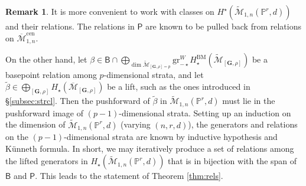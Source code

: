 \documentclass[12pt,reqno]{amsart}
\theoremstyle{definition}
\theoremstyle{definition}
\theoremstyle{definition}
\theoremstyle{definition}
\newtheorem{remark}[theorem]{Remark}
\newcommand{\ol}[1]{\overline{#1}}
\newcommand{\PP}{\mathbb{P}}
\newcommand{\Mcal}{\mathcal{M}}
\newcommand{\Mbar}{\ol{\Mcal}}
\newcommand{\Mtil}{\widetilde{\mathcal{M}}}
\newcommand{\gr}{\mathrm{gr}}
\begin{document}
\begin{remark}
It is more convenient to work with classes on $H^\star(\Mtil_{1,n}(\PP^r,d))$ and their relations. The relations in $\boldsymbol{\mathsf{P}}$ are known to be pulled back from relations on $\Mbar_{1,n}^{\mathrm{cen}}.$ 

On the other hand, let $\beta\in \boldsymbol{\mathsf{B}}\cap \bigoplus_{\dim \Mtil_{[\mathbf{G},\rho]=p}}\gr^W_{-\star}H_{\star}^{\mathrm{BM}}(\Mtil_{[\mathbf{G},\rho]})$ be a basepoint relation among $p$-dimensional strata, and let $\tilde{\beta}\in \bigoplus_{[\mathbf{G},\rho]}H_{\star}(\Mbar_{[\mathbf{G},\rho]})$ be a lift, such as the ones introduced in §\ref{subsec:strcl}. Then the pushforward of $\tilde{\beta}$ in $\Mtil_{1,n}(\PP^r,d)$ must lie in the pushforward image of $(p-1)$-dimensional strata. Setting up an induction on the dimension of $\Mtil_{1,n}(\PP^r,d)$ (varying $(n,r,d)$), the generators and relations on the $(p-1)$-dimensional strata are known by inductive hypothesis and Künneth formula. In short, we may iteratively produce a set of relations among the lifted generators in $H_\star(\Mtil_{1,n}(\PP^r,d))$ that is in bijection with the span of $\boldsymbol{\mathsf{B}}$ and $\boldsymbol{\mathsf{P}}.$ This leads to the statement of Theorem \ref{thm:rels}.
\end{remark}




\,
\end{document}
